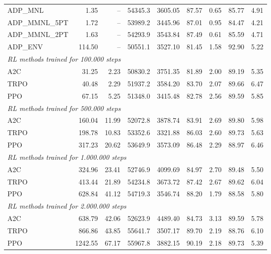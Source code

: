 \begin{samepage}
\begin{center}
\begin{tabular}{l|rr|rr|rr|rr}
    \midrule
    ADP\_MNL     &     1.35 &    -- &    54345.3 &    3605.05 &   87.57 &    0.65 &   85.77 &    4.91 \\
    ADP\_MMNL\_5PT &     1.72 &    -- &    53989.2 &    3445.96 &   87.01 &    0.95 &   84.47 &    4.21 \\
    ADP\_MMNL\_2PT &     1.63 &    -- &    54293.9 &    3543.84 &   87.49 &    0.61 &   85.59 &    4.71 \\
    ADP\_ENV     &   114.50 &    -- &    50551.1 &    3527.10 &   81.45 &    1.58 &   92.90 &    5.22 \\
    \midrule
    \multicolumn{9}{l}{\textit{RL methods trained for 100.000 steps}} \\
    \midrule
    A2C          &    31.25 &     2.23 &    50830.2 &    3751.35 &   81.89 &    2.00 &   89.19 &    5.35 \\
    TRPO         &    40.48 &     2.29 &    51937.2 &    3584.20 &   83.70 &    2.07 &   89.66 &    6.47 \\
    PPO          &    67.15 &     5.25 &    51348.0 &    3415.48 &   82.78 &    2.56 &   89.59 &    5.85 \\
    \midrule
    \multicolumn{9}{l}{\textit{RL methods trained for 500.000 steps}} \\
    \midrule
    A2C          &   160.04 &    11.99 &    52072.8 &    3878.74 &   83.91 &    2.69 &   89.80 &    5.98 \\
    TRPO         &   198.78 &    10.83 &    53352.6 &    3321.88 &   86.03 &    2.60 &   89.73 &    5.63 \\
    PPO          &   317.23 &    20.62 &    53649.9 &    3573.09 &   86.48 &    2.29 &   88.97 &    6.46 \\
    \midrule
    \multicolumn{9}{l}{\textit{RL methods trained for 1.000.000 steps}} \\
    \midrule
    A2C          &   324.96 &    23.41 &    52746.9 &    4099.69 &   84.97 &    2.70 &   89.48 &    5.50 \\
    TRPO         &   413.44 &    21.89 &    54234.8 &    3673.72 &   87.42 &    2.67 &   89.62 &    6.04 \\
    PPO          &   628.84 &    41.12 &    54719.3 &    3546.74 &   88.20 &    1.79 &   88.58 &    5.80 \\
    \midrule
    \multicolumn{9}{l}{\textit{RL methods trained for 2.000.000 steps}} \\
    \midrule
    A2C          &   638.79 &    42.06 &    52623.9 &    4489.40 &   84.73 &    3.13 &   89.59 &    5.78 \\
    TRPO         &   866.86 &    43.85 &    55641.7 &    3507.17 &   89.70 &    2.19 &   88.76 &    6.10 \\
    PPO          &  1242.55 &    67.17 &    55967.8 &    3882.15 &   90.19 &    2.18 &   89.73 &    5.39 \\
    \bottomrule
  \end{tabular}
\end{center}
\end{samepage}

